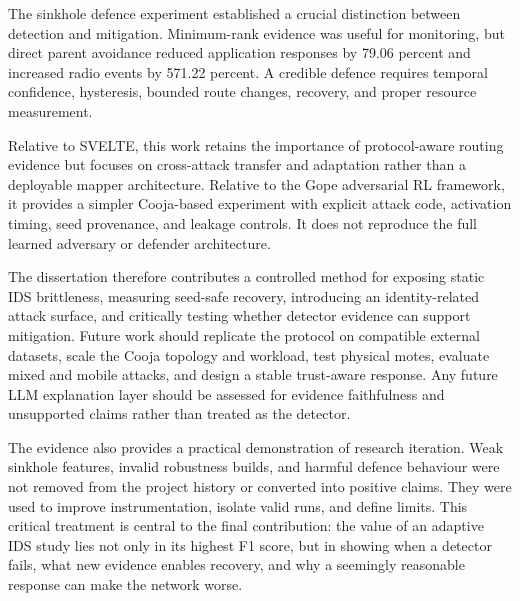 The sinkhole defence experiment established a crucial distinction between detection and mitigation. Minimum-rank evidence was useful for monitoring, but direct parent avoidance reduced application responses by 79.06 percent and increased radio events by 571.22 percent. A credible defence requires temporal confidence, hysteresis, bounded route changes, recovery, and proper resource measurement.

Relative to SVELTE, this work retains the importance of protocol-aware routing evidence but focuses on cross-attack transfer and adaptation rather than a deployable mapper architecture. Relative to the Gope adversarial RL framework, it provides a simpler Cooja-based experiment with explicit attack code, activation timing, seed provenance, and leakage controls. It does not reproduce the full learned adversary or defender architecture.

The dissertation therefore contributes a controlled method for exposing static IDS brittleness, measuring seed-safe recovery, introducing an identity-related attack surface, and critically testing whether detector evidence can support mitigation. Future work should replicate the protocol on compatible external datasets, scale the Cooja topology and workload, test physical motes, evaluate mixed and mobile attacks, and design a stable trust-aware response. Any future LLM explanation layer should be assessed for evidence faithfulness and unsupported claims rather than treated as the detector.

The evidence also provides a practical demonstration of research iteration. Weak sinkhole features, invalid robustness builds, and harmful defence behaviour were not removed from the project history or converted into positive claims. They were used to improve instrumentation, isolate valid runs, and define limits. This critical treatment is central to the final contribution: the value of an adaptive IDS study lies not only in its highest F1 score, but in showing when a detector fails, what new evidence enables recovery, and why a seemingly reasonable response can make the network worse.
